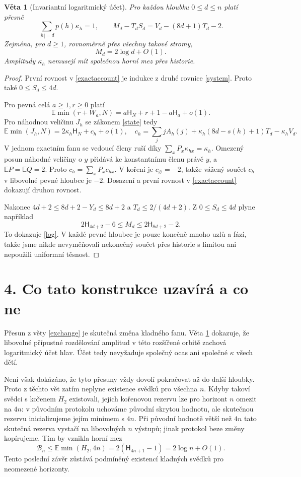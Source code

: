 \documentclass[11pt,a4paper]{article}
\newtheorem{theorem}{Věta}
\newcommand{\HH}{\mathsf H}
\begin{document}
\begin{theorem}[Invariantní logaritmický účet]\label{account}
Pro každou hloubku $0\le d\le n$ platí přesně
\begin{equation}\label{exactaccount}
 \boxed{
 \sum_{|h|=d}p(h)\kappa_h=1,\qquad
 M_d-T_dS_d=V_d-(8d+1)T_d-2.}
\end{equation}
Zejména, pro $d\ge1$, rovnoměrně přes všechny takové stromy,
\begin{equation}\label{log}
 \boxed{M_d=2\log d+O(1).}
\end{equation}
Amplitudy $\kappa_h$ nemusejí mít společnou horní mez přes historie.
\end{theorem}
\begin{proof}
První rovnost v \eqref{exactaccount} je indukce z druhé rovnice
\eqref{system}. Proto také $0\le S_d\le4d$.

Pro pevná celá $a\ge1,r\ge0$ platí
\[
 \mathbb E\min(r+W_a,N)
 =a\HH_N+r+1-a\HH_a+o(1).
\]
Pro náhodnou veličinu $J_h$ se zákonem \eqref{state} tedy
\[
 \mathbb E\min(J_h,N)=2\kappa_h\HH_N+c_h+o(1),
\quad c_h=\sum_jjA_h(j)+\kappa_h(8d-s(h)+1)T_d-\kappa_h V_d.
\]
V jednom exactním fanu se vedoucí členy ruší díky
$\sum_xP_x\kappa_{hx}=\kappa_h$. Omezený posun náhodné veličiny o $y$
přidává ke konstantnímu členu právě $y$, a $\mathbb EP=\mathbb EQ=2$.
Proto $c_h=\sum_xP_xc_{hx}$.
V kořeni je $c_\varnothing=-2$, takže vážený součet $c_h$ v libovolné
pevné hloubce je $-2$. Dosazení a první rovnost v
\eqref{exactaccount} dokazují druhou rovnost.

Nakonec $4d+2\le8d+2-Y_d\le8d+2$ a
$T_d\le2/(4d+2)$. Z $0\le S_d\le4d$ plyne například
\[
 2\HH_{4d+2}-6\le M_d\le2\HH_{8d+2}-2.
\]
To dokazuje \eqref{log}. V každé pevné hloubce je pouze konečně mnoho
uzlů a fází, takže jsme nikde nevyměňovali nekonečný součet přes
historie s limitou ani nepoužili uniformní těsnost.
\end{proof}

\section*{4. Co tato konstrukce uzavírá a co ne}
Přesun z věty \ref{exchange} je skutečná změna kladného fanu.
Věta \ref{account} dokazuje, že libovolné přípustné rozdělování amplitud
v této rozšířené orbitě zachová logaritmický účet hlav. Účet tedy
nevyžaduje společný ocas ani společné $\kappa$ všech dětí.

Není však dokázáno, že tyto přesuny vždy dovolí pokračovat až do další
hloubky. Proto z těchto vět zatím neplyne existence svědků pro všechna
$n$. Kdyby takoví svědci s kořenem $H_2$ existovali, jejich kořenovou
rezervu lze pro horizont $n$ omezit na $4n$: v původním protokolu
uchováme původní skrytou hodnotu, ale skutečnou rezervu inicializujeme
jejím minimem s $4n$. Při původní hodnotě větší než $4n$ tato skutečná
rezerva vystačí na libovolných $n$ výstupů; jinak protokol beze změny
kopírujeme. Tím by vznikla horní mez
\[
 \mathcal B_n\le\mathbb E\min(H_2,4n)
 =2(\HH_{4n+1}-1)=2\log n+O(1).
\]
Tento poslední závěr zůstává podmíněný existencí kladných svědků pro
neomezené horizonty.
\end{document}
